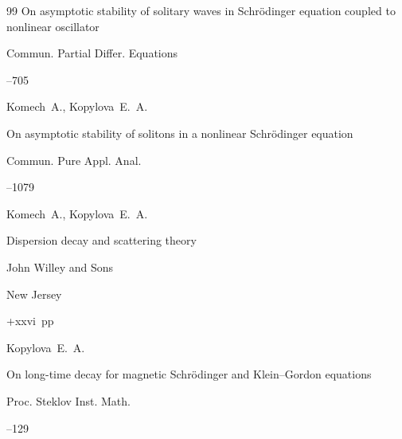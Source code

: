 \begin{thebibliography}{99}
\paper On asymptotic stability of solitary waves in Schrödinger equation coupled to nonlinear oscillator


\jour Commun. Partial Differ. Equations 




--705





\by Komech~A., Kopylova~E.~A.  

\paper On asymptotic stability of solitons in a nonlinear Schrödinger equation

\jour Commun. Pure Appl. Anal.



--1079 






\by  Komech~A., Kopylova~E.~A. 

\book Dispersion decay and scattering theory


\publ John Willey and Sons

\publaddr New Jersey


+xxvi~pp \nofrills





\by Kopylova~E.~A.

\paper On long-time decay for magnetic Schr\"odinger and Klein--Gordon equations


\jour Proc. Steklov Inst. Math.



--129



\end{thebibliography}
